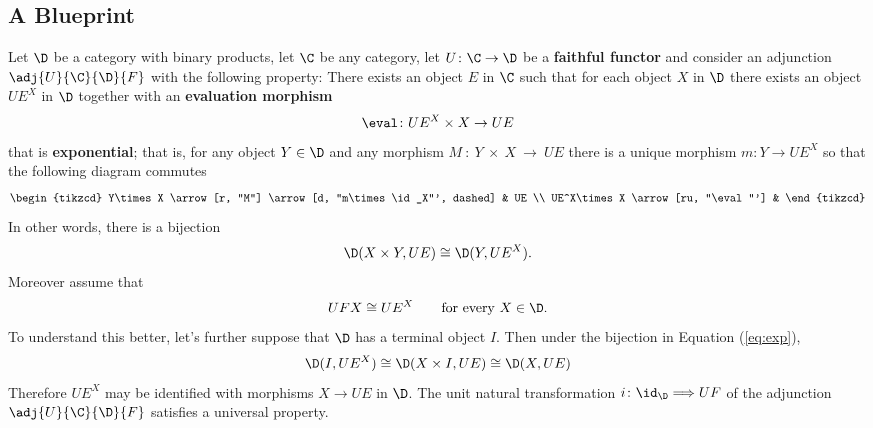 \subsection{A Blueprint}

Let $\D$ be a category with binary products, let $\C$ be any category, let $U\colon \C\to\D$ be a \textbf{faithful functor}
and consider an adjunction $\adj{U}{\C}{\D}{F}$ with the following property: There exists an object $E$ in $\C$ such that for each object $X$ in $\D$ there exists an object $UE^X$ in $\D$ together with an \textbf{evaluation morphism} \[\eval\colon UE^X\times X\to UE\] that is \textbf{exponential}; that is, for any object $Y\in\D$ and any morphism $M~\colon~Y~\times~X~\to~UE$ there is a unique morphism $m\colon Y\to UE^X$ so that the following diagram commutes
\[
  \begin{tikzcd}
  Y\times X \arrow[r, "M"] \arrow[d, "m\times \id_X"', dashed] & UE \\
  UE^X\times X \arrow[ru, "\eval"']                                     &   
  \end{tikzcd}
\]
In other words, there is a bijection
\begin{equation}\label{eq:exp}
\D(X\times Y,UE)\cong \D(Y,UE^X).
\end{equation}
Moreover assume that
\begin{equation}\label{eq:UE}
UFX\cong UE^X \qquad\text{for every $X\in \D$.}
\end{equation}
To understand this better, let's further suppose that $\D$ has a terminal object $I$. Then under the bijection in Equation (\ref{eq:exp}),
\[\D(I,UE^X)\cong \D(X\times I,UE)\cong \D(X,UE)\]
Therefore $UE^X$ may be identified with morphisms $X\to UE$ in $\D$. The unit natural transformation $i\colon \id_\D \Longrightarrow UF$ of the adjunction $\adj{U}{\C}{\D}{F}$ satisfies a universal property.


